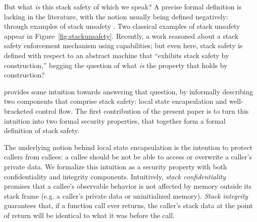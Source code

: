 \documentclass[acmsmall,review,anonymous]{acmart}\settopmatter{printfolios=true,printccs=false,printacmref=false}
\begin{document}
But what {\em is} this stack safety of which we speak? A precise formal
definition is lacking in the literature, with the notion usually being
defined negatively: through examples of stack unsafety
. Two classical
examples of stack unsafety appear in Figure~\ref{fig:stackunsafety}.
Recently, a  work reasoned
about a stack safety enforcement mechanism using capabilities;
but even here, stack safety is defined with respect to an abstract
machine that ``exhibits stack safety by construction,'' begging
the question of what {\em is} the property that holds by construction?

 provides some intuition towards answering that question,
by informally describing two components that comprise stack safety:
local state encapsulation and well-bracketed control flow. The first
contribution of the present paper is to
turn this intuition into two formal  security properties,
that together form a formal definition of stack safety.

The underlying notion behind local state encapsulation is the
intention to protect callers from callees: a callee should be not be
able to access or overwrite a caller's private data. We formalize this
intuition as a security property with both confidentiality and
integrity components.
%
Intuitively, {\em stack confidentiality} promises that a callee's
observable behavior is not affected by memory outside its stack frame
(e.g. a caller's private data or uninitialized memory).  {\em Stack
  integrity} guarantees that, if a function call ever returns, the caller's
stack data at the point of return will be identical to what it was before
the call.  
\end{document}
